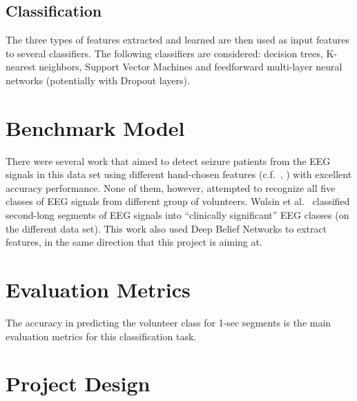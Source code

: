 \documentclass[12pt]{article}
\begin{document}
\subsection{Classification}

The three types of features extracted and learned are then used as input features to several classifiers. The following classifiers are considered: decision trees, K-nearest neighbors, Support Vector Machines and feedforward multi-layer neural networks (potentially with Dropout layers).

\section{Benchmark Model}

There were several work that aimed to detect seizure patients from the EEG signals in this data set using different hand-chosen features (c.f.~\cite{nigam2004neural}, \cite{kabir2016epileptic}) with excellent accuracy performance. None of them, however, attempted to recognize all five classes of EEG signals from different group of volunteers. Wulsin et al.~\cite{wulsin2011modeling} classified second-long segments of EEG signals into ``clinically significant'' EEG classes (on the different data set). This work also used Deep Belief Networks to extract features, in the same direction that this project is aiming at.

\section{Evaluation Metrics}

The accuracy in predicting the volunteer class for 1-sec segments is the main evaluation metrics for this classification task.

\section{Project Design}



\end{document}
